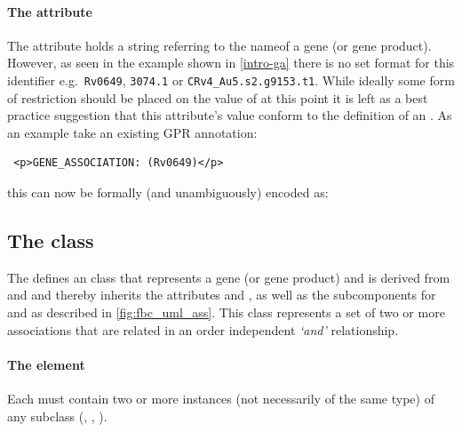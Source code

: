 
\paragraph{The  attribute}
The  attribute holds a string referring to the nameof a gene (or gene product). However, as seen in the example shown in \ref{intro-ga} there is no set format for this identifier e.g.~\verb+Rv0649+, \verb+3074.1+ or \verb+CRv4_Au5.s2.g9153.t1+. While ideally some form of restriction should be placed on the value of  at this point it is left as a best practice suggestion that this attribute's value conform to the definition of an . As an example take an existing GPR annotation:
\begin{verbatim}
 <p>GENE_ASSOCIATION: (Rv0649)</p>
\end{verbatim}
%
this can now be formally (and unambiguously) encoded as:
%

\subsection{The \FBC {} class}
\label{and-class}

The \FBCPackage defines an \GeneAnd class that represents a gene (or gene product) and is derived from and \Association and thereby inherits the \SBase attributes  and , as well as the subcomponents for \Annotation and \Notes as described in \ref{fig:fbc_uml_ass}. This class represents a set of two or more associations that are related in an order independent \emph{`and'} relationship.

\paragraph{The  element}
Each \GeneAnd must contain two or more instances (not necessarily of the same type) of any \Association subclass (\GeneAnd, \GeneOr, \Gene).

